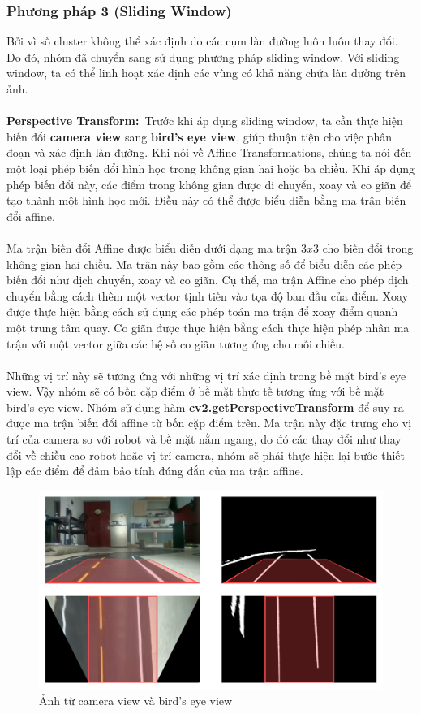 \subsubsection{Phương pháp 3 (Sliding Window)}
Bởi vì số cluster không thể xác định do các cụm làn đường luôn luôn thay đổi. Do đó, nhóm đã chuyển sang sử dụng phương pháp sliding window. Với sliding window, ta có thể linh hoạt xác định các vùng có khả năng chứa làn đường trên ảnh.\\\\
\textbf{Perspective Transform:}\
Trước khi áp dụng sliding window, ta cần thực hiện biến đổi \textbf{camera view} sang \textbf{bird’s eye view}, giúp thuận tiện cho việc phân đoạn và xác định làn đường. Khi nói về Affine Transformations, chúng ta nói đến một loại phép biến đổi hình học trong không gian hai hoặc ba chiều. Khi áp dụng phép biến đổi này, các điểm trong không gian được di chuyển, xoay và co giãn để tạo thành một hình học mới. Điều này có thể được biểu diễn bằng ma trận biến đổi affine.\\\\
Ma trận biến đổi Affine được biểu diễn dưới dạng ma trận $3x3$ cho biến đổi trong
không gian hai chiều. Ma trận này bao gồm các thông số để biểu diễn các phép biến đổi
như dịch chuyển, xoay và co giãn. Cụ thể, ma trận Affine cho phép dịch chuyển bằng
cách thêm một vector tịnh tiến vào tọa độ ban đầu của điểm. Xoay được thực hiện bằng
cách sử dụng các phép toán ma trận để xoay điểm quanh một trung tâm quay. Co giãn
được thực hiện bằng cách thực hiện phép nhân ma trận với một vector giữa các hệ số co
giãn tương ứng cho mỗi chiều.\\\\
Những vị trí này sẽ tương ứng với những vị trí xác định trong bề mặt bird’s eye view. Vậy nhóm sẽ có bốn cặp điểm ở bề mặt thực tế tương ứng với bề mặt bird’s eye view. Nhóm sử dụng hàm \textbf{cv2.getPerspectiveTransform} để suy ra được ma trận biến đổi affine từ bốn cặp điểm trên. Ma trận này đặc trưng cho vị trí của camera so với robot và bề mặt nằm ngang, do đó các thay đổi như thay đổi về chiều cao robot hoặc vị trí camera, nhóm sẽ phải thực hiện lại bước thiết lập các điểm để đảm bảo tính đúng đắn của ma trận affine.
\newpage
\begin{figure}[!hbt]
\begin{center}
    \includegraphics[width=15cm]{img/4_Implement/sliding_window/perspective_transform.png}
    \caption{Ảnh từ camera view và bird's eye view}
\end{center}
\end{figure}
